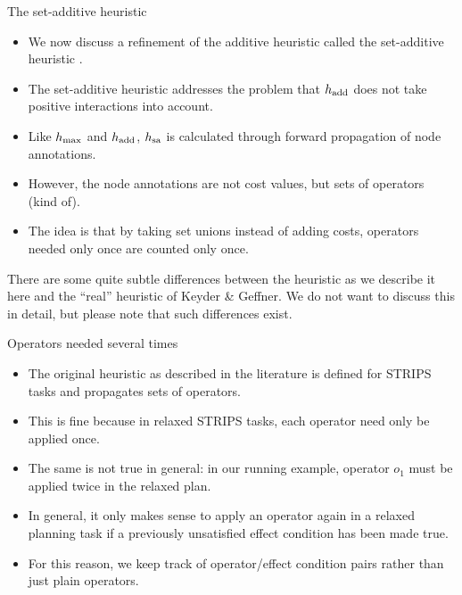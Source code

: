 \documentclass{gkibeamer}
\begin{document}
\begin{frame}{The set-additive heuristic}
  \begin{itemize}
  \item We now discuss a refinement of the additive heuristic
    called the \alert{set-additive heuristic} \alert{\hsa}.
  \item The set-additive heuristic addresses the problem that
    $h_{\text{add}}$ does not take positive interactions into account.
  \item Like $h_{\text{max}}$ and $h_{\text{add}}$, $h_{\text{sa}}$ is calculated through
    \alert{forward propagation} of node annotations.
  \item However, the node annotations are not cost values,
    but \alert{sets of operators} (kind of).
  \item The idea is that by taking \alert{set unions} instead of
    \alert{adding costs}, operators needed only once are
    \alert{counted only once}.
  \end{itemize}
  \begin{scriptsize}
     There are some quite subtle
    differences between the {\hsa} heuristic as we describe it here and
    the ``real'' heuristic of Keyder \& Geffner. We do not want to
    discuss this in detail, but please note that such differences
    exist.
  \end{scriptsize}
\end{frame}

\begin{frame}{Operators needed several times}
  \begin{itemize}
  \item The original {\hsa} heuristic as described in the literature
    is defined for STRIPS tasks and propagates \alert{sets of
      operators}.
  \item This is fine because in relaxed STRIPS tasks, each operator
    \alert{need only be applied once}.
  \item The same is \alert{not true in general}: in our running
    example, operator $o_1$ must be applied twice in the relaxed plan.
  \item In general, it only makes sense to apply an operator again in
    a relaxed planning task if a \alert{previously unsatisfied effect
      condition} has been made true.
  \item For this reason, we keep track of \alert{operator/effect
    condition pairs} rather than just plain operators.
  \end{itemize}
\end{frame}
\end{document}
